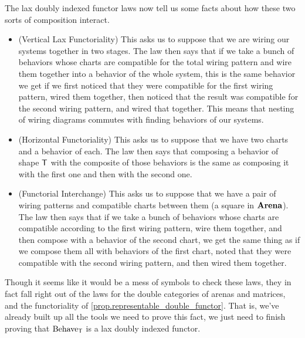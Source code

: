 \documentclass[DynamicalBook]{subfiles}
\begin{document}
The lax doubly indexed functor laws now tell us some facts about how these two
sorts of composition interact.
\begin{itemize}
  \item (Vertical Lax Functoriality) This asks us to suppose that we are wiring
    our systems together in two stages. The law then says that if we take a
    bunch of behaviors whose charts are compatible for the total wiring pattern
    and wire them together into a behavior of the whole system, this is the same
    behavior we get if we first noticed that they were compatible for the first
    wiring pattern, wired them together, then noticed that the result was
    compatible for the second wiring pattern, and wired that together. This
    means that nesting of wiring diagrams commutes with finding behaviors of our systems.
  \item (Horizontal Functoriality) This asks us to suppose that we have two
    charts and a behavior of each. The law then says that composing a behavior
    of shape $\mathsf{T}$ with the composite of those behaviors is the same as composing
    it with the first one and then with the second one.
  \item (Functorial Interchange) This asks us to suppose that we have a pair of
    wiring patterns and compatible charts between them (a square in $\textbf{Arena}$). The law then says that if we
    take a bunch of behaviors whose charts are compatible according to the first
    wiring pattern, wire them together, and then compose with a behavior of the
    second chart, we get the same thing as if we compose them all with behaviors
    of the first chart, noted that they were compatible with the second wiring
    pattern, and then wired them together.
\end{itemize}

Though it seems like it would be a mess of symbols to check these laws, they in
fact fall right out of the laws for the double categories of arenas and
matrices, and the functoriality of \cref{prop.representable_double_functor}.
That is, we've already built up all the tools we need to prove this fact, we
just need to finish proving that $\mathrm{Behave}_{\mathsf{T}}$ is a lax doubly indexed functor.
\end{document}
